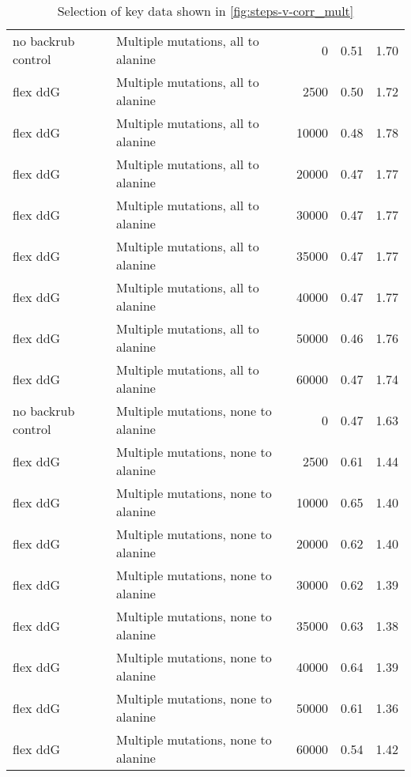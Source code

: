 \begin{table}
\begin{tabular}{llrrr}
 no backrub control &   Multiple mutations, all to alanine &             0 & 0.51 & 1.70 \\
           flex ddG &   Multiple mutations, all to alanine &          2500 & 0.50 & 1.72 \\
           flex ddG &   Multiple mutations, all to alanine &         10000 & 0.48 & 1.78 \\
           flex ddG &   Multiple mutations, all to alanine &         20000 & 0.47 & 1.77 \\
           flex ddG &   Multiple mutations, all to alanine &         30000 & 0.47 & 1.77 \\
           flex ddG &   Multiple mutations, all to alanine &         35000 & 0.47 & 1.77 \\
           flex ddG &   Multiple mutations, all to alanine &         40000 & 0.47 & 1.77 \\
           flex ddG &   Multiple mutations, all to alanine &         50000 & 0.46 & 1.76 \\
           flex ddG &   Multiple mutations, all to alanine &         60000 & 0.47 & 1.74 \\
 no backrub control &  Multiple mutations, none to alanine &             0 & 0.47 & 1.63 \\
           flex ddG &  Multiple mutations, none to alanine &          2500 & 0.61 & 1.44 \\
           flex ddG &  Multiple mutations, none to alanine &         10000 & 0.65 & 1.40 \\
           flex ddG &  Multiple mutations, none to alanine &         20000 & 0.62 & 1.40 \\
           flex ddG &  Multiple mutations, none to alanine &         30000 & 0.62 & 1.39 \\
           flex ddG &  Multiple mutations, none to alanine &         35000 & 0.63 & 1.38 \\
           flex ddG &  Multiple mutations, none to alanine &         40000 & 0.64 & 1.39 \\
           flex ddG &  Multiple mutations, none to alanine &         50000 & 0.61 & 1.36 \\
           flex ddG &  Multiple mutations, none to alanine &         60000 & 0.54 & 1.42 \\
\bottomrule
\end{tabular}

\caption[]{Selection of key data shown in \cref{fig:steps-v-corr_mult}}
\label{tab:steps-v-corr_mult-underlying-data}
\end{table}
